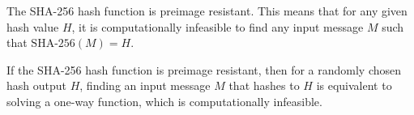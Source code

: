 \setcounter{theorem}{0}
\renewcommand{\thetheorem}{D.\arabic{theorem}}  

\begin{theorem}
    The SHA-256 hash function is preimage resistant. This means that for any given hash value \( H \), it is computationally infeasible to find any input message \( M \) such that \( \text{SHA-256}(M) = H \).
\end{theorem}

\begin{corollary}
    If the SHA-256 hash function is preimage resistant, then for a randomly chosen hash output \( H \), finding an input message \( M \) that hashes to \( H \) is equivalent to solving a one-way function, which is computationally infeasible.
\end{corollary}
